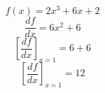 \documentclass{article}
\begin{document}
\section{}
$$f ( x ) = 2x^{3} + 6x + 2
$$$$\frac{d f}{d x} = 6x^{2} + 6
$$$$[ \frac{d f}{d x} ]_{x = 1} = 6 + 6
$$$$[ \frac{d f}{d x} ]_{x = 1} = 12
$$
\end{document}
